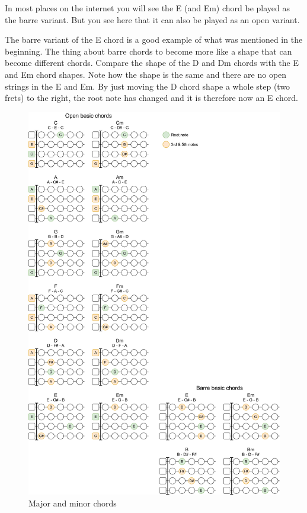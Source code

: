 In most places on the internet you will see the E (and Em) chord be played as the barre variant. But you see here that it can also be played as an open variant.

The barre variant of the E chord is a good example of what was mentioned in the beginning. The thing about barre chords to become more like a shape that can become different chords. Compare the shape of the D and Dm chords with the E and Em chord shapes. Note how the shape is the same and there are no open strings in the E and Em. By just moving the D chord shape a whole step (two frets) to the right, the root note has changed and it is therefore now an E chord.

\newpage

\begin{figure}[h]
	\centering
	\includegraphics[height=0.9\textheight]{../../Images/UkuleleBasicChords.png}
	\caption{Major and minor chords}
	\label{fig:ukulele_major_minor_chords}
\end{figure}